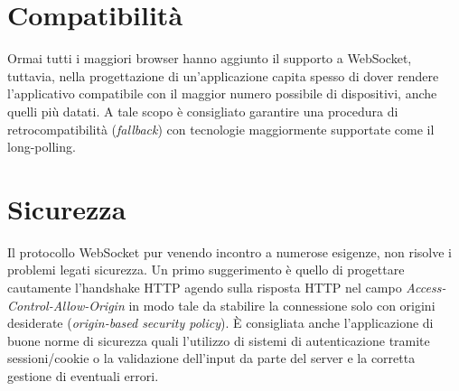 \documentclass[
  oneside,
  11pt, a4paper,
  footinclude=true,
  headinclude=true,
  cleardoublepage=empty
]{scrbook}
\begin{document}
\section{Compatibilità}
Ormai tutti i maggiori browser hanno aggiunto il supporto a WebSocket,
tuttavia, nella progettazione di un'applicazione capita spesso di dover rendere l'applicativo compatibile con il maggior numero possibile di dispositivi, anche quelli più datati.
A tale scopo è consigliato garantire una procedura di retrocompatibilità (\textit{fallback}) con tecnologie maggiormente supportate come il long-polling.
\section{Sicurezza}
Il protocollo WebSocket pur venendo incontro a numerose esigenze, non risolve i problemi legati sicurezza.
Un primo suggerimento è quello di progettare cautamente l'handshake HTTP agendo sulla risposta HTTP nel campo \textit{Access-Control-Allow-Origin} in modo tale da stabilire la connessione solo con origini desiderate (\textit{origin-based security policy}).
È consigliata anche l'applicazione di buone norme di sicurezza quali l'utilizzo di sistemi di autenticazione tramite sessioni/cookie o la validazione dell'input da parte del server e la corretta gestione di eventuali errori.

    
\end{document}
